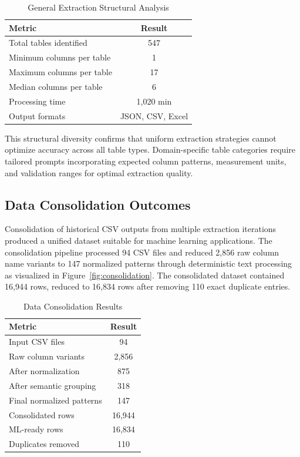 \documentclass{svproc}
\begin{document}
\begin{table}[htbp]
\caption{General Extraction Structural Analysis}
\label{tab:general_extraction}
\begin{center}
\small
\begin{tabular}{lc}
\toprule
\textbf{Metric} & \textbf{Result} \\
\midrule
Total tables identified & 547 \\
Minimum columns per table & 1 \\
Maximum columns per table & 17 \\
Median columns per table & 6 \\
Processing time & 1,020 min \\
Output formats & JSON, CSV, Excel \\
\bottomrule
\end{tabular}
\end{center}
\end{table}

This structural diversity confirms that uniform extraction strategies cannot optimize accuracy across all table types. Domain-specific table categories require tailored prompts incorporating expected column patterns, measurement units, and validation ranges for optimal extraction quality.

\subsection{Data Consolidation Outcomes}

Consolidation of historical CSV outputs from multiple extraction iterations produced a unified dataset suitable for machine learning applications. The consolidation pipeline processed 94 CSV files and reduced 2,856 raw column name variants to 147 normalized patterns through deterministic text processing as visualized in Figure~\ref{fig:consolidation}. The consolidated dataset contained 16,944 rows, reduced to 16,834 rows after removing 110 exact duplicate entries.

\begin{table}[htbp]
\caption{Data Consolidation Results}
\label{tab:consolidation}
\begin{center}
\small
\begin{tabular}{lc}
\toprule
\textbf{Metric} & \textbf{Result} \\
\midrule
Input CSV files & 94 \\
Raw column variants & 2,856 \\
After normalization & 875 \\
After semantic grouping & 318 \\
Final normalized patterns & 147 \\
Consolidated rows & 16,944 \\
ML-ready rows & 16,834 \\
Duplicates removed & 110 \\
\bottomrule
\end{tabular}
\end{center}
\end{table}
\end{document}
